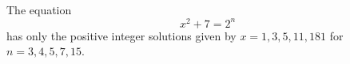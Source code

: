 \begin{proposition}\label{eq:182}
    The equation
\[
    x^2+7=2^n
\]
    has only the positive integer solutions given by $x=1,3,5,11,181$ for $n=3,4,5,7,15$.
\end{proposition}
